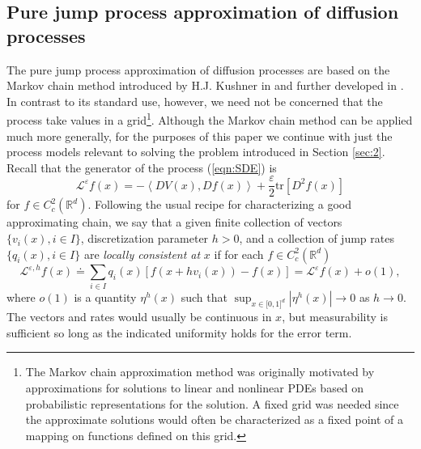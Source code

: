\documentclass[english,11pt]{article}%
\numberwithin{equation}{section}
\numberwithin{example}{section}
\numberwithin{theorem}{section}
\begin{document}
\subsection{Pure jump process approximation of diffusion processes}
The pure jump process approximation of diffusion processes are based on the Markov chain method introduced by H.J. Kushner in \cite{kus77} and further developed in \cite{kusdup1}. In contrast to its standard use, however, we need not be concerned that the process take values in a grid\footnote{The Markov chain approximation method was originally motivated by approximations for solutions to linear and nonlinear PDEs based on probabilistic representations for the solution. A fixed grid was needed since the approximate solutions would often be characterized as a fixed point of a mapping on functions defined on this grid. }. Although the Markov chain method can be applied much more generally, for the
purposes of this paper we continue with just the process models relevant to
solving the problem introduced in Section \ref{sec:2}. Recall that the
generator of the process (\ref{eqn:SDE}) is%
\[
\mathcal{L}^{\varepsilon}f(x)=-\left\langle DV(x),Df(x)\right\rangle
+\frac{\varepsilon}{2}\text{tr}[D^{2}f(x)]
\]
for $f\in C_{c}^{2}(\mathbb{R}^{d})$. Following the usual recipe for
characterizing a good approximating chain, we say that a given finite
collection of vectors $\{v_{i}(x),i\in I\}$, discretization parameter $h>0$,
and a collection of jump rates $\{q_{i}(x),i\in I\}$ are \textit{locally
consistent at} $x$ if for each $f\in C_{c}^{2}(\mathbb{R}^{d})$
\begin{equation}
\label{eqn:loccons}\mathcal{L}^{\varepsilon,h}f(x)\doteq\sum_{i\in I}%
q_{i}(x)\left[  f(x+hv_{i}(x))-f(x)\right]  =\mathcal{L}^{\varepsilon}f(x)
+o(1),
\end{equation}
where $o(1)$ is a quantity $\eta^{h}(x)$ such that $\sup_{x\in\lbrack0,1]^{d}%
}\left\vert \eta^{h}(x)\right\vert \rightarrow0$ as $h\rightarrow0$. The
vectors and rates would usually be continuous in $x$, but measurability is
sufficient so long as the indicated uniformity holds for the error term.
\end{document}
